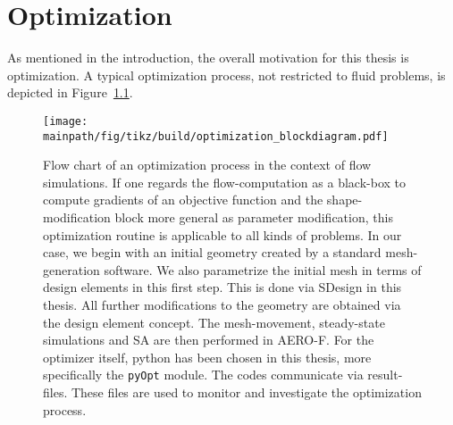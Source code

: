 \documentclass[../main.tex]{subfiles}
\begin{document}
\setlength{\delimitershortfall}{0pt}
\chapter{Optimization}\label{sec:optimization}
\minitoc


As mentioned in the introduction, the overall motivation for this thesis is optimization. A typical optimization process, not restricted to fluid problems, is depicted in Figure~\ref{fig:optimization_blockdiagram}.
\begin{figure}[h!]
	\begin{center}
        \texttt{[image: \\mainpath/fig/tikz/build/optimization\_blockdiagram.pdf]}
        \caption[Optimization scheme: block-diagram]{Flow chart of an optimization process in the context of flow simulations. If one regards the flow-computation as a black-box to compute gradients of an objective function and the shape-modification block more general as parameter modification, this optimization routine is applicable to all kinds of problems. In our case, we begin with an initial geometry created by a standard mesh-generation software. We also parametrize the initial mesh in terms of design elements in this first step. This is done via SDesign\cite{SDesign} in this thesis. All further modifications to the geometry are obtained via the design element concept. The mesh-movement, steady-state simulations and \acf{SA} are then performed in AERO-F\cite{Aerof}. For the optimizer itself, python has been chosen in this thesis, more specifically the \texttt{pyOpt} module. The codes communicate via result-files. These files are used to monitor and investigate the optimization process.}
		\label{fig:optimization_blockdiagram}
    \end{center}
\end{figure}

\end{document}

